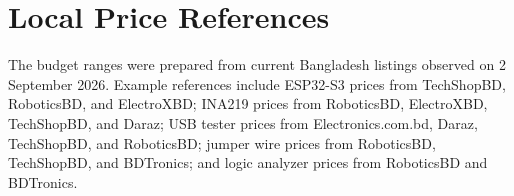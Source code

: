 \documentclass[11pt]{article}
\begin{document}
\section*{Local Price References}
The budget ranges were prepared from current Bangladesh listings observed on 2 September 2026. Example references include ESP32-S3 prices from TechShopBD, RoboticsBD, and ElectroXBD; INA219 prices from RoboticsBD, ElectroXBD, TechShopBD, and Daraz; USB tester prices from Electronics.com.bd, Daraz, TechShopBD, and RoboticsBD; jumper wire prices from RoboticsBD, TechShopBD, and BDTronics; and logic analyzer prices from RoboticsBD and BDTronics.
\end{document}
